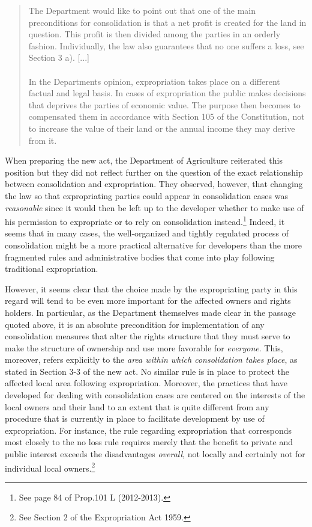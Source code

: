 \begin{quote}
The Department would like to point out that one of the main preconditions for consolidation is that a net profit is created for the land in question. This profit is then divided among the parties in an orderly fashion. Individually, the law also guarantees that no one suffers a loss, see Section 3 a). [...] \\ \\ In the Departments opinion, expropriation takes place on a different factual and legal basis. In cases of expropriation the public makes decisions that deprives the parties of economic value. The purpose then becomes to compensated them in accordance with Section 105 of the Constitution, not to increase the value of their land or the annual income they may derive from it.
\end{quote}

When preparing the new act, the Department of Agriculture reiterated this position but they did not reflect further on the question of the exact relationship between consolidation and expropriation. They observed, however, that changing the law so that expropriating parties could appear in consolidation cases was \emph{reasonable} since it would then be left up to the developer whether to make use of his permission to expropriate or to rely on consolidation instead.\footnote{See page 84 of Prop.101 L (2012-2013).} Indeed, it seems that in many cases, the well-organized and tightly regulated process of consolidation might be a more practical alternative for developers than the more fragmented rules and administrative bodies that come into play following traditional expropriation. 

However, it seems clear that the choice made by the expropriating party in this regard will tend to be even more important for the affected owners and rights holders. In particular, as the Department themselves made clear in the passage quoted above, it is an absolute precondition for implementation of any consolidation measures that alter the rights structure that they must serve to make the structure of ownership and use more favorable for \emph{everyone}. This, moreover, refers explicitly to the \emph{area within which consolidation takes place}, as stated in Section 3-3 of the new act. No similar rule is in place to protect the affected local area following expropriation. Moreover, the practices that have developed for dealing with consolidation cases are centered on the interests of the local owners and their land to an extent that is quite different from any procedure that is currently in place to facilitate development by use of expropriation.
For instance, the rule regarding expropriation that corresponds most closely to the no loss rule  
requires merely that the benefit to private and public interest exceeds the disadvantages \emph{overall}, not locally and certainly not for individual local owners.\footnote{See Section 2 of the Expropriation Act 1959.} 

